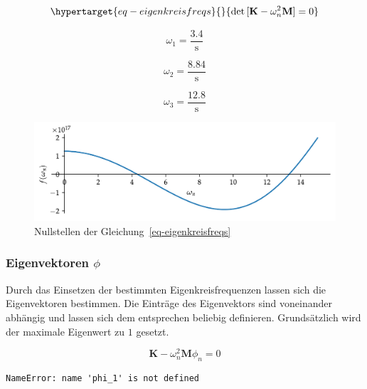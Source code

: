 \documentclass[
  letterpaper,
  DIV=11]{scrreprt}
\begin{document}
\begin{equation}\protect\hypertarget{eq-eigenkreisfreqs}{}{
\det{[\mathbf{K}-\omega_n^2 \mathbf{M}]=0}
}\label{eq-eigenkreisfreqs}\end{equation}

\begin{equation}\omega_{1} = \frac{3.4}{\text{s}}\end{equation}

\begin{equation}\omega_{2} = \frac{8.84}{\text{s}}\end{equation}

\begin{equation}\omega_{3} = \frac{12.8}{\text{s}}\end{equation}

\begin{figure}[H]

{\centering \includegraphics{index_files/mediabag/mms_04_files/figure-pdf/fig-loesung_eigenkreisfrequenzen-output-1.pdf}

}

\caption{\label{fig-loesung_eigenkreisfrequenzen}Nullstellen der
Gleichung~\ref{eq-eigenkreisfreqs}}

\end{figure}

\hypertarget{eigenvektoren-phi-2}{%
\subsubsection{\texorpdfstring{Eigenvektoren
\(\phi\)}{Eigenvektoren \textbackslash phi}}\label{eigenvektoren-phi-2}}

Durch das Einsetzen der bestimmten Eigenkreisfrequenzen lassen sich die
Eigenvektoren bestimmen. Die Einträge des Eigenvektors sind voneinander
abhängig und lassen sich dem entsprechen beliebig definieren.
Grundsätzlich wird der maximale Eigenwert zu \(1\) gesetzt.

\[\mathbf{K} - \omega_n^2 \mathbf{M} \phi_n= 0\]

\begin{verbatim}
NameError: name 'phi_1' is not defined
\end{verbatim}
\end{document}
